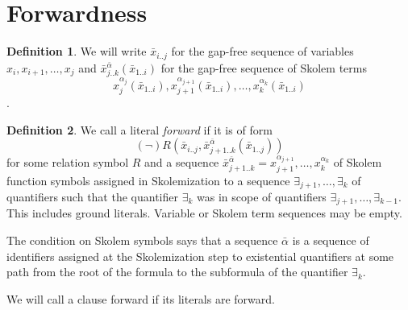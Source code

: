 \documentclass[english, shortabstract]{iithesis}
\theoremstyle{definition} \newtheorem{definition}{Definition}[chapter]
\theoremstyle{remark} \newtheorem{remark}[definition]{Observation}
\theoremstyle{plain} \newtheorem{theorem}[definition]{Theorem}
\theoremstyle{plain} \newtheorem{lemma}[definition]{Lemma}
\begin{document}
\section{Forwardness}

\begin{definition}\label{def:notation}
We will write $\bar{x}_{i..j}$ for the gap-free sequence of variables $x_i, x_{i+1}, \dots, x_j$ and 
$\bar{x}^{\bar{\alpha}}_{j..k}(\bar{x}_{1..i})$ for the gap-free sequence of Skolem terms
$$x^{\alpha_{j}}_{j}(\bar{x}_{1..i}), x^{\alpha_{j+1}}_{j+1}(\bar{x}_{1..i}), \dots, x^{\alpha_k}_k(\bar{x}_{1..i})$$.
\end{definition}

\begin{definition}\label{def:forward}
We call a literal \emph{forward} if it is of form
$$(\lnot)R(\bar{x}_{i..j}, \bar{x}^{\bar{\alpha}}_{{j+1..k}}(\bar{x}_{1..j}))$$
for some relation symbol $R$
and a sequence $\bar{x}^{\bar{\alpha}}_{{j+1..k}}=x^{\alpha_{j+1}}_{j+1}, \dots, x^{\alpha_{k}}_{k}$ of 
Skolem function symbols assigned in Skolemization to a sequence $\exists_{j+1}, \dots, \exists_{k}$ of quantifiers 
such that the quantifier $\exists_{k}$ was in scope of quantifiers $\exists_{j+1}, \dots, \exists_{k-1}$.
This includes ground literals. Variable or Skolem term sequences may be empty.
\end{definition}

The condition on Skolem symbols says that a sequence $\bar{\alpha}$ is a
sequence of identifiers assigned at the Skolemization step to existential quantifiers
at some path from the root of the formula to the subformula of the quantifier $\exists_k$.

We will call a clause forward if its literals are forward.
\end{document}
